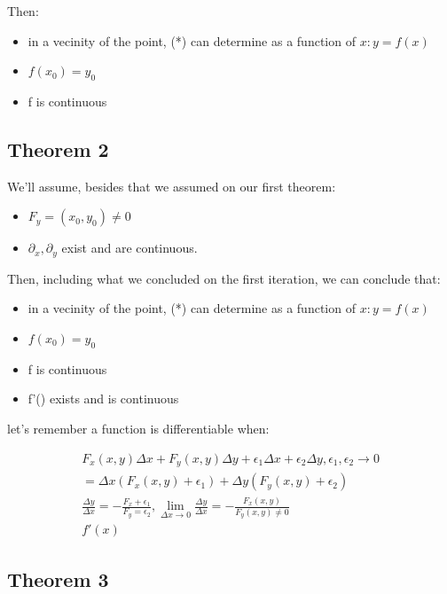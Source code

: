 \documentclass[11pt,fleqn]{book} %
\begin{document}
Then:

\begin{itemize}
    \item in a vecinity of the point, (*) can determine as a function of $x: y = f(x)$
    \item $f(x_0) = y_0$
    \item f is continuous
\end{itemize}

\subsection{Theorem 2}

We'll assume, besides that we assumed on our first theorem:
\begin{itemize}
    \item $F_y = (x_0,y_0) \neq 0$
    \item $\partial_x, \partial_y$ exist and are continuous.
\end{itemize}

Then, including what we concluded on the first iteration, we can conclude that:
\begin{itemize}
    \item in a vecinity of the point, (*) can determine as a function of $x: y = f(x)$
    \item $f(x_0) = y_0$
    \item f is continuous
    \item f'() exists and is continuous
\end{itemize}

let's remember a function is differentiable when:

\begin{gather}
    F_x (x,y) \Delta x + F_y (x,y) \Delta y + \epsilon_1 \Delta x + \epsilon_2 \Delta y, \epsilon_1, \epsilon_2 \rightarrow 0 \\
    = \Delta x (F_x(x,y) + \epsilon_1) + \Delta y (F_y (x,y)+ \epsilon_2) \\
    \frac{\Delta y}{\Delta x} = - \frac{F_x + \epsilon_1}{F_y = \epsilon_2}, \lim_{\Delta x \to 0} \frac{\Delta y}{\Delta x} = - \frac{F_x(x,y)}{F_y(x,y) \neq 0}\\
    f'(x)
\end{gather}

\subsection{Theorem 3}
\end{document}
